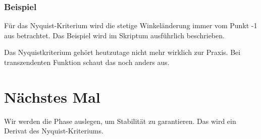 \documentclass[a4paper]{article}
\begin{document}
\subsubsection*{Beispiel}
 Für das Nyquist-Kriterium wird die stetige Winkeländerung immer vom Punkt -1 aus betrachtet. Das Beispiel wird im Skriptum ausführlich beschrieben.

 Das Nyquistkriterium gehört heutzutage nicht mehr wirklich zur Praxis. Bei transzendenten Funktion schaut das noch anders aus.

 \section*{Nächstes Mal}
 Wir werden die Phase auslegen, um Stabilität zu garantieren. Das wird ein Derivat des Nyquist-Kriteriums.
\end{document}
